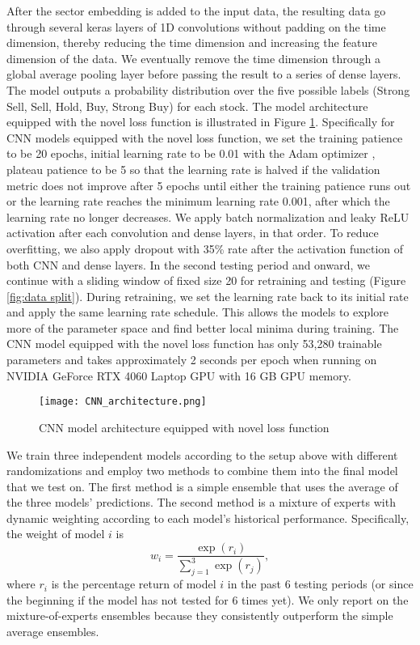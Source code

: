 \documentclass[preprint,12pt,numafflabel,authoryear]{elsarticle}
\begin{document}
After the sector embedding is added to the input data, the resulting data go through several keras layers of 1D convolutions without padding on the time dimension, thereby reducing the time dimension and increasing the feature dimension of the data. We eventually remove the time dimension through a global average pooling layer before passing the result to a series of dense layers. The model outputs a probability distribution over the five possible labels (Strong Sell, Sell, Hold, Buy, Strong Buy) for each stock. The model architecture equipped with the novel loss function is illustrated in Figure \ref{fig:CNN architecture}. Specifically for CNN models equipped with the novel loss function, we set the training patience to be 20 epochs, initial learning rate to be 0.01 with the Adam optimizer \citep{kingma2017adam}, plateau patience to be 5 so that the learning rate is halved if the validation metric does not improve after 5 epochs until either the training patience runs out or the learning rate reaches the minimum learning rate 0.001, after which the learning rate no longer decreases. We apply batch normalization \citep{ioffe2015batch} and leaky ReLU activation after each convolution and dense layers, in that order. To reduce overfitting, we also apply dropout \citep{srivastava2014dropout} with 35\% rate after the activation function of both CNN and dense layers. In the second testing period and onward, we continue with a sliding window of fixed size 20 for retraining and testing (Figure \ref{fig:data split}). During retraining, we set the learning rate back to its initial rate and apply the same learning rate schedule. This allows the models to explore more of the parameter space and find better local minima during training. The CNN model equipped with the novel loss function has only 53,280 trainable parameters and takes approximately 2 seconds per epoch when running on NVIDIA GeForce RTX 4060 Laptop GPU with 16 GB GPU memory.

\begin{figure}[htp]
\centering
\texttt{[image: CNN\_architecture.png]}
\caption{CNN model architecture equipped with novel loss function}
\label{fig:CNN architecture}
\end{figure}

We train three independent models according to the setup above with different randomizations and employ two methods to combine them into the final model that we test on. The first method is a simple ensemble that uses the average of the three models' predictions. The second method is a mixture of experts with dynamic weighting according to each model's historical performance. Specifically, the weight of model $i$ is 
\begin{equation}
\label{eq:mixture of experts weights}
w_i = \frac{\exp(r_i)}{\sum_{j=1}^3 \exp(r_j)},
\end{equation}
where $r_i$ is the percentage return of model $i$ in the past 6 testing periods (or since the beginning if the model has not tested for 6 times yet). We only report on the mixture-of-experts ensembles because they consistently outperform the simple average ensembles.
\end{document}
